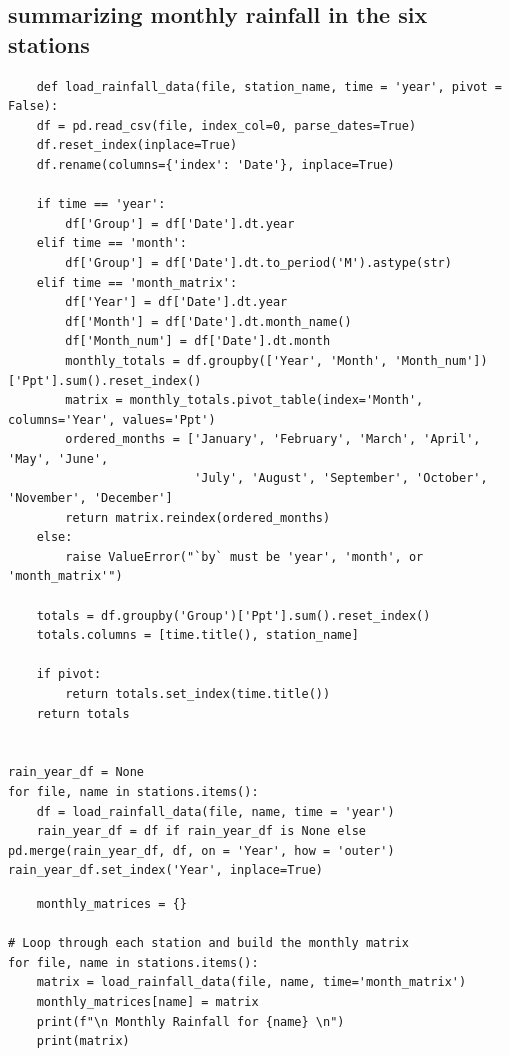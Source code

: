\documentclass[12pt]{article}
\theoremstyle{definition}
\begin{document}
\subsection{summarizing monthly rainfall in the six stations}
\begin{verbatim}
    def load_rainfall_data(file, station_name, time = 'year', pivot = False):
    df = pd.read_csv(file, index_col=0, parse_dates=True)
    df.reset_index(inplace=True)
    df.rename(columns={'index': 'Date'}, inplace=True)
    
    if time == 'year':
        df['Group'] = df['Date'].dt.year
    elif time == 'month':
        df['Group'] = df['Date'].dt.to_period('M').astype(str)
    elif time == 'month_matrix':
        df['Year'] = df['Date'].dt.year
        df['Month'] = df['Date'].dt.month_name()
        df['Month_num'] = df['Date'].dt.month
        monthly_totals = df.groupby(['Year', 'Month', 'Month_num'])['Ppt'].sum().reset_index()
        matrix = monthly_totals.pivot_table(index='Month', columns='Year', values='Ppt')
        ordered_months = ['January', 'February', 'March', 'April', 'May', 'June',
                          'July', 'August', 'September', 'October', 'November', 'December']
        return matrix.reindex(ordered_months)
    else:
        raise ValueError("`by` must be 'year', 'month', or 'month_matrix'")

    totals = df.groupby('Group')['Ppt'].sum().reset_index()
    totals.columns = [time.title(), station_name]

    if pivot:
        return totals.set_index(time.title())
    return totals


rain_year_df = None
for file, name in stations.items():
    df = load_rainfall_data(file, name, time = 'year')
    rain_year_df = df if rain_year_df is None else pd.merge(rain_year_df, df, on = 'Year', how = 'outer')
rain_year_df.set_index('Year', inplace=True)
\end{verbatim}
\begin{verbatim}
    monthly_matrices = {}

# Loop through each station and build the monthly matrix
for file, name in stations.items():
    matrix = load_rainfall_data(file, name, time='month_matrix')
    monthly_matrices[name] = matrix
    print(f"\n Monthly Rainfall for {name} \n")
    print(matrix)
\end{verbatim}
\end{document}
